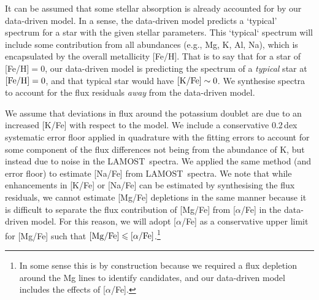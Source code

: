 \documentclass[a4paper,fleqn,usenatbib]{mnras}
\newcommand{\todo}[1]{\textcolor{red}{#1}}
\newcommand{\project}[1]{#1}
\newcommand{\lamost}{\project{LAMOST}}
\begin{document}
It can be assumed that some stellar absorption is already accounted for by our data-driven model. In a sense, the data-driven model predicts a `typical' spectrum for a star with the given stellar parameters. This `typical` spectrum will include some contribution from all abundances (e.g., Mg, K, Al, Na), which is encapsulated by the overall metallicity [Fe/H]. That is to say that for a star of [Fe/H]$ = 0$, our data-driven model is predicting the spectrum of a \emph{typical} star at $[{\rm Fe/H}] = 0$, and that typical star would have $[{\rm K/Fe}] \sim 0$. We synthesise spectra to account for the flux residuals \emph{away} from the data-driven model. 

We assume that deviations in flux around the potassium doublet are due to an increased [K/Fe] with respect to the model. We include a conservative 0.2\,dex systematic error floor applied in quadrature with the fitting errors to account for some component of the flux differences not being from the abundance of K, but instead due to noise in the \lamost\ spectra. We applied the same method (and error floor) to estimate [Na/Fe] from \lamost\ spectra. We note that while enhancements in [K/Fe] or [Na/Fe] can be estimated by synthesising the flux residuals, we cannot estimate [Mg/Fe] depletions in the same manner because it is difficult to separate the flux contribution of [Mg/Fe] from [$\alpha$/Fe] in the data-driven model. For this reason, we will adopt [$\alpha$/Fe] as a conservative upper limit for [Mg/Fe] such that $[{\rm Mg}/{\rm Fe}] \leq [\alpha/{\rm Fe}]$.\footnote{In some sense this is by construction because we required a flux depletion around the Mg lines to identify candidates, and our data-driven model includes the effects of [$\alpha$/Fe].}

\end{document}
